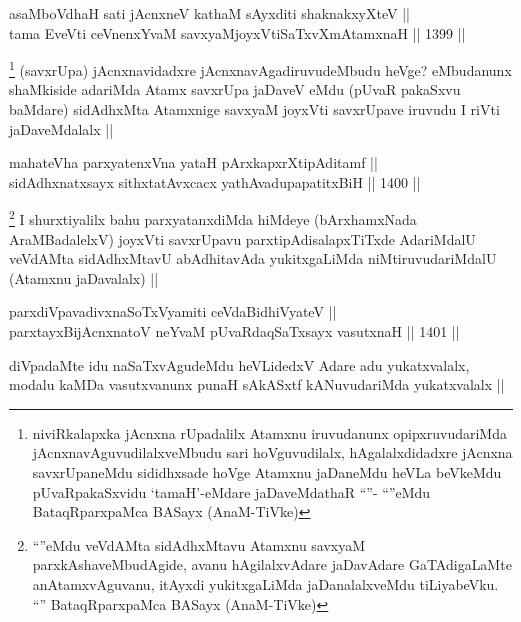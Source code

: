 
\begin{shl}
asaMboVdhaH sati jAcnxneV kathaM sAyxditi shaknakxyXteV || \\
tama EveVti ceVnenxYvaM savxyaMjoyxVtiSaTxvXmAtamxnaH \hfill || 1399 ||  
\end{shl}

\begin{artha}
\footnote{niviRkalapxka jAcnxna rUpadalilx Atamxnu iruvudanunx opipxruvudariMda jAcnxnavAguvudilalxveMbudu sari hoVguvudilalx, hAgalalxdidadxre jAcnxna savxrUpaneMdu sididhxsade hoVge Atamxnu jaDaneMdu heVLa beVkeMdu pUvaRpakaSxvidu `tamaH'-eMdare jaDaveMdathaR ``\stext''- ``\stext''eMdu BataqRparxpaMca BASayx (AnaM-TiVke)}
(savxrUpa) jAcnxnavidadxre jAcnxnavAgadiruvudeMbudu heVge? eMbudanunx shaMkiside adariMda Atamx savxrUpa jaDaveV eMdu (pUvaR pakaSxvu baMdare) sidAdhxMta Atamxnige savxyaM joyxVti savxrUpave iruvudu I riVti jaDaveMdalalx ||
\end{artha}

\begin{shl}
mahateVha parxyatenxVna yataH pArxkapxrXtipAditamf ||  \\
sidAdhxnatxsayx sithxtatAvxcacx yathAvadupapatitxBiH \hfill || 1400 ||  
\end{shl}

\begin{artha}
\footnote{``\stext''eMdu veVdAMta sidAdhxMtavu Atamxnu savxyaM parxkAshaveMbudAgide, avanu hAgilalxvAdare jaDavAdare GaTAdigaLaMte anAtamxvAguvanu, itAyxdi yukitxgaLiMda jaDanalalxveMdu tiLiyabeVku. ``\stext'' BataqRparxpaMca BASayx (AnaM-TiVke)}
I shurxtiyalilx bahu parxyatanxdiMda hiMdeye (bArxhamxNada AraMBadalelxV) joyxVti savxrUpavu parxtipAdisalapxTiTxde AdariMdalU veVdAMta sidAdhxMtavU abAdhitavAda yukitxgaLiMda niMtiruvudariMdalU (Atamxnu jaDavalalx) ||
\end{artha}


\begin{shl}
parxdiVpavadivxnaSoTxV\s yamiti ceVdaBidhiVyateV || \\
parxtayxBijAcnxnatoV neYvaM pUvaRdaqSaTxsayx vasutxnaH \hfill || 1401 ||  
\end{shl}

\begin{artha}
diVpadaMte idu naSaTxvAgudeMdu heVLidedxV Adare adu yukatxvalalx, modalu kaMDa vasutxvanunx punaH sAkASxtf kANuvudariMda yukatxvalalx ||
\end{artha}


